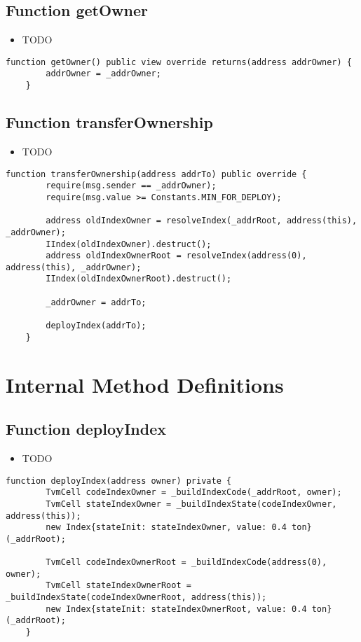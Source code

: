 \subsection{Function getOwner}

\begin{itemize}
\item TODO
\end{itemize}

\begin{lstlisting}[firstnumber=69]
    function getOwner() public view override returns(address addrOwner) {
        addrOwner = _addrOwner;
    }
\end{lstlisting}

\subsection{Function transferOwnership}

\begin{itemize}
\item TODO
\end{itemize}

\begin{lstlisting}[firstnumber=35]
    function transferOwnership(address addrTo) public override {
        require(msg.sender == _addrOwner);
        require(msg.value >= Constants.MIN_FOR_DEPLOY);

        address oldIndexOwner = resolveIndex(_addrRoot, address(this), _addrOwner);
        IIndex(oldIndexOwner).destruct();
        address oldIndexOwnerRoot = resolveIndex(address(0), address(this), _addrOwner);
        IIndex(oldIndexOwnerRoot).destruct();

        _addrOwner = addrTo;

        deployIndex(addrTo);
    }
\end{lstlisting}

\section{Internal Method Definitions}


\subsection{Function deployIndex}

\begin{itemize}
\item TODO
\end{itemize}

\begin{lstlisting}[firstnumber=49]
    function deployIndex(address owner) private {
        TvmCell codeIndexOwner = _buildIndexCode(_addrRoot, owner);
        TvmCell stateIndexOwner = _buildIndexState(codeIndexOwner, address(this));
        new Index{stateInit: stateIndexOwner, value: 0.4 ton}(_addrRoot);

        TvmCell codeIndexOwnerRoot = _buildIndexCode(address(0), owner);
        TvmCell stateIndexOwnerRoot = _buildIndexState(codeIndexOwnerRoot, address(this));
        new Index{stateInit: stateIndexOwnerRoot, value: 0.4 ton}(_addrRoot);
    }
\end{lstlisting}

